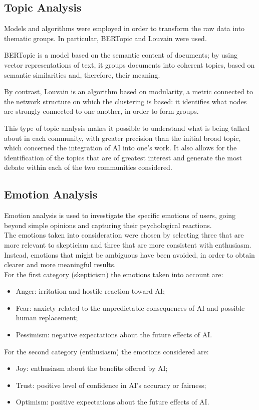 \documentclass[conference]{IEEEtran}
\begin{document}
\subsection{Topic Analysis}
Models and algorithms were employed in order to transform the raw data into thematic groups. In particular, BERTopic and Louvain were used.

BERTopic is a model based on the semantic content of documents; by using vector representations of text, it groups documents into coherent topics, based on semantic similarities and, therefore, their meaning.

By contrast, Louvain is an algorithm based on modularity, a metric connected to the network structure on which the clustering is based: it identifies what nodes are strongly connected to one another, in order to form groups.

This type of topic analysis makes it possible to understand what is being talked about in each community, with greater precision than the initial broad topic, which concerned the integration of AI into one’s work. It also allows for the identification of the topics that are of greatest interest and generate the most debate within each of the two communities considered.

\subsection{Emotion Analysis}
Emotion analysis is used to investigate the specific emotions of users, going beyond simple opinions and capturing their psychological reactions.\\
The emotions taken into consideration were chosen by selecting three that are more relevant to skepticism and three that are more consistent with enthusiasm. Instead, emotions that might be ambiguous have been avoided, in order to obtain clearer and more meaningful results.\\
For the first category (skepticism) the emotions taken into account are:
\begin{itemize}
    \item Anger: irritation and hostile reaction toward AI;
    \item Fear: anxiety related to the unpredictable consequences of AI and possible human replacement;
    \item Pessimism: negative expectations about the future effects of AI.
\end{itemize}
For the second category (enthusiasm) the emotions considered are:
\begin{itemize}
    \item Joy: enthusiasm about the benefits offered by AI;
    \item Trust: positive level of confidence in AI’s accuracy or fairness;
    \item Optimism: positive expectations about the future effects of AI.
\end{itemize}
\end{document}
